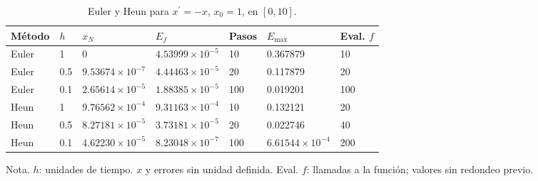 \begin{table}[H]\centering\small\setlength{\tabcolsep}{4pt}
\caption{Euler y Heun para $x^{\prime}=-x$, $x_0=1$, en $[0,10]$.}\label{tab:comparacion}
\begin{tabular}{lllllll}
\toprule
Método & $h$ & $x_N$ & $E_f$ & Pasos & $E_{\max}$ & Eval. $f$\\
\midrule
Euler & 1 & 0 & $4.53999\times 10^{-5}$ & 10 & 0.367879 & 10\\
Euler & 0.5 & $9.53674\times 10^{-7}$ & $4.44463\times 10^{-5}$ & 20 & 0.117879 & 20\\
Euler & 0.1 & $2.65614\times 10^{-5}$ & $1.88385\times 10^{-5}$ & 100 & 0.019201 & 100\\
Heun & 1 & $9.76562\times 10^{-4}$ & $9.31163\times 10^{-4}$ & 10 & 0.132121 & 20\\
Heun & 0.5 & $8.27181\times 10^{-5}$ & $3.73181\times 10^{-5}$ & 20 & 0.022746 & 40\\
Heun & 0.1 & $4.62230\times 10^{-5}$ & $8.23048\times 10^{-7}$ & 100 & $6.61544\times 10^{-4}$ & 200\\
\bottomrule\end{tabular}
\end{table}
{\footnotesize Nota. $h$: unidades de tiempo. $x$ y errores sin unidad definida. Eval. $f$: llamadas a la función; valores sin redondeo previo.}
